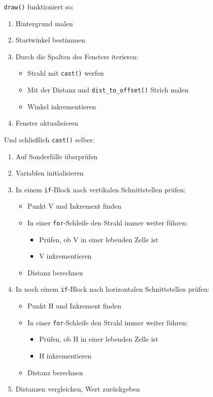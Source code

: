 \documentclass[a4paper,12pt]{report}
\begin{document}
\texttt{draw()} funktioniert so:
\begin{spacing}{1.0}
\begin{framed}
\begin{enumerate}
	\item Hintergrund malen
	\item Startwinkel bestimmen
	\item Durch die Spalten des Fensters iterieren:
	\begin{itemize}
		\item Strahl mit \texttt{cast()} werfen
		\item Mit der Distanz und \texttt{dist\_to\_offset()} Strich malen
		\item Winkel inkrementieren
	\end{itemize}
	\item Fenster aktualisieren
\end{enumerate}
\end{framed}
\end{spacing}

Und schlie\ss lich \texttt{cast()} selber:
\begin{spacing}{1.0}
\begin{framed}
\begin{enumerate}
	\item Auf Sonderf\"alle \"uberpr\"ufen
	\item Variablen initialisieren
	\item In einem \texttt{if}-Block nach vertikalen Schnittstellen pr\"ufen:
	\begin{itemize}
		\item Punkt V und Inkrement finden
		\item In einer \texttt{for}-Schleife den Strahl immer weiter f\"uhren:
		\begin{itemize}
			\item Pr\"ufen, ob V in einer lebenden Zelle ist
			\item V inkrementieren
		\end{itemize}
		\item Distanz berechnen
	\end{itemize}
	\item In noch einem \texttt{if}-Block nach horizontalen Schnittstellen pr\"ufen:
	\begin{itemize}
		\item Punkt H und Inkrement finden
		\item In einer \texttt{for}-Schleife den Strahl immer weiter f\"uhren:
		\begin{itemize}
			\item Pr\"ufen, ob H in einer lebenden Zelle ist
			\item H inkrementieren
		\end{itemize}
		\item Distanz berechnen
	\end{itemize}
	\item Distanzen vergleichen, Wert zur\"uckgeben
\end{enumerate}
\end{framed}
\end{spacing}
\end{document}
